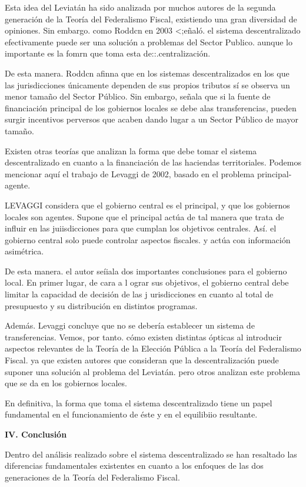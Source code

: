 \documentclass[10pt,a4paper]{article}
\begin{document}
Esta idea del Leviatán ha sido analizada por muchos autores de la segunda generación de la Teoría del Federalismo Fiscal, existiendo una gran diversidad de opiniones. Sin embargo. como Roddcn en 2003 <;eñaló. el sistema descentralizado efectivamente puede ser una solución a problemas del Sector Publico. aunque lo importante es la fomrn que toma esta de::.centralización.

De esta manera. Roddcn afinna que en los sistemas descentralizados en los que las jurisdicciones únicamente dependen de sus propios tributos sí se observa un menor tamaño del Sector Público. Sin embargo, señala que si la fuente de financiación principal de los gobiernos locales se debe alas transferencias, pueden surgir incentivos perversos que acaben dando lugar a un Sector Público de mayor tamaño.

Existen otras teorías que analizan la forma que debe tomar el sistema descentralizado en cuanto a la financiación de las haciendas territoriales. Podemos mencionar aquí el trabajo de Levaggi de 2002, basado en el problema principal-agente.

LEVAGGI considera que el gobierno central es el principal, y que los gobiernos locales son agentes. Supone que el principal actúa de tal manera que trata de influir en las juiisdicciones para que cumplan los objetivos centrales. Así. el gobierno central solo puede controlar aspectos fiscales. y actúa con información asimétrica.

De esta manera. el autor seíiala dos importantes conclusiones para el gobierno local. En primer lugar, de cara a l ograr sus objetivos, el gobierno central debe limitar la capacidad de decisión de las j urisdicciones en cuanto al total de presupuesto y su distribución en distintos programas.

Además. Levaggi concluye que no se debería establecer un sistema de transferencias. Vemos, por tanto. cómo existen distintas ópticas al introducir aspectos relevantes de la Teoría de la Elección Pública a la Teoría del Federalismo Fiscal. ya que existen autores que consideran que la descentralización puede suponer una solución al problema del Leviatán. pero otros analizan este problema que se da en los gobiernos locales.

En definitiva, la forma que toma el sistema descentralizado tiene un papel fundamental en el funcionamiento de éste y en el equilibiio resultante.

\textbf{IV. Conclusión}

Dentro del análisis realizado sobre el sistema descentralizado se han resaltado las diferencias fundamentales existentes en cuanto a los enfoques de las dos generaciones de la Teoría del Federalismo Fiscal.
\end{document}
